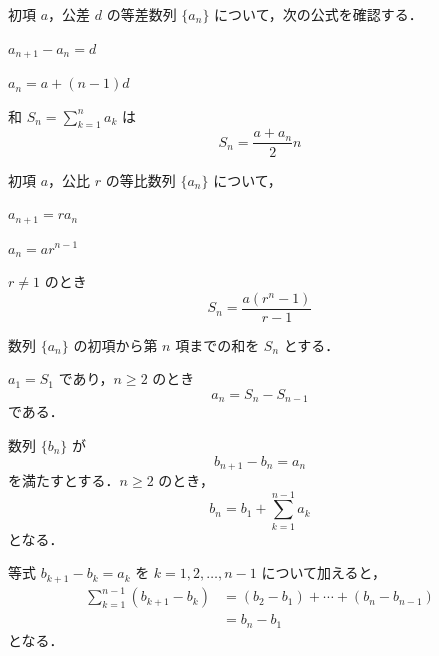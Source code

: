 \documentclass[lualatex,paper=b5j,fontsize=10pt,twoside]{jlreq}
\begin{document}
\MakeMathMagazineTitle
\MMConfirmationReset


初項 $a$，公差 $d$ の等差数列 $\{a_n\}$ について，次の公式を確認する．

\begin{mmconfirmationroman}
  \item $a_{n+1}-a_n=d$
  \item $a_n=a+(n-1)d$
  \item 和 $S_n=\sum_{k=1}^{n}a_k$ は
    \[
      S_n=\dfrac{a+a_n}{2}n
    \]
\end{mmconfirmationroman}



初項 $a$，公比 $r$ の等比数列 $\{a_n\}$ について，

\begin{mmconfirmationroman}
  \item $a_{n+1}=ra_n$
  \item $a_n=ar^{n-1}$
  \item $r\neq 1$ のとき
    \[
      S_n=\dfrac{a(r^n-1)}{r-1}
    \]
\end{mmconfirmationroman}





数列 $\{a_n\}$ の初項から第 $n$ 項までの和を $S_n$ とする．

$a_1=S_1$ であり，$n\geq 2$ のとき
\[
  a_n=S_n-S_{n-1}
\]
である．



数列 $\{b_n\}$ が
\[
  b_{n+1}-b_n=a_n
\]
を満たすとする．$n\geq 2$ のとき，
\[
  b_n=b_1+\sum_{k=1}^{n-1}a_k
\]
となる．

\begin{mmconfirmationproof}
等式 $b_{k+1}-b_k=a_k$ を $k=1,2,\ldots,n-1$ について加えると，
\begin{align*}
  \sum_{k=1}^{n-1}(b_{k+1}-b_k)
    &= (b_2-b_1)+\cdots+(b_n-b_{n-1}) \\
    &= b_n-b_1
\end{align*}
となる．
\end{mmconfirmationproof}
\end{document}
